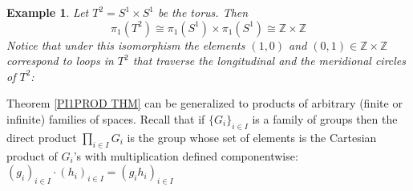 \documentclass[11pt, letterpaper, oneside]{report}
\theoremstyle{pplain}
\theoremstyle{ddefinition}
\newtheorem{example}[theorem]{Example}
\theoremstyle{nnn}
\theoremstyle{eexercise}
\newcommand{\Z}{{\mathbb Z}}
\begin{document}
\begin{example}
\label{PI1TORUS EXAMPLE}
Let $T^{2}= S^{1}\times S^{1}$ be the torus. Then 
$$\pi_{1}(T^{2})\cong \pi_{1}(S^{1})\times \pi_{1}(S^{1}) \cong \Z\times \Z$$  
Notice that under this isomorphism the elements $(1, 0)$ and $(0, 1)\in \Z\times \Z$
correspond to loops in $T^{2}$ that traverse the longitudinal and the meridional circles 
of $T^{2}$:

\end{example}




Theorem \ref{PI1PROD THM} can be generalized to products of  arbitrary (finite or infinite)
families of spaces. Recall that if $\{G_{i}\}_{i\in I}$ is a family of groups then the direct product 
$\prod_{i\in I} G_{i}$ is the group whose set of elements is the Cartesian product of $G_{i}$'s 
with multiplication defined componentwise: $(g_{i})_{i\in I} \cdot (h_{i})_{i\in I} = (g_{i}h_{i})_{i\in I}$  
\end{document}
